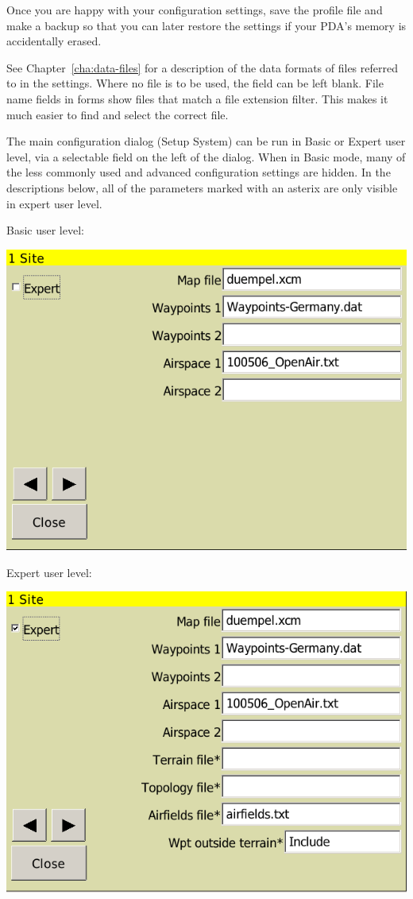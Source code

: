 \documentclass[a4paper,12pt]{refrep}
\begin{document}
\tip Once you are happy with your configuration settings, save the
profile file and make a backup so that you can later restore the
settings if your PDA's memory is accidentally erased.

See Chapter~\ref{cha:data-files} for a description of the data formats
of files referred to in the settings.  Where no file is to be used,
the field can be left blank.  File name fields in forms show files
that match a file extension filter.  This makes it much easier to find
and select the correct file.

The main configuration dialog (Setup System) can be run in Basic or
Expert user level, via a selectable field on the left of the dialog.
When in Basic mode, many of the less commonly used and advanced
configuration settings are hidden.  In the descriptions below,
all of the parameters marked with an asterix are only visible in
expert user level.

Basic user level:
\begin{center}
\includegraphics[angle=0,width=\linewidth,keepaspectratio='true']{figures/config-basic.png}
\end{center}

Expert user level:
\begin{center}
\includegraphics[angle=0,width=\linewidth,keepaspectratio='true']{figures/config-expert.png}
\end{center}
\end{document}

